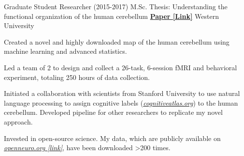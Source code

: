 \begin{cventries}
  \cventry
    {Graduate Student Researcher (2015-2017)} %
    {M.Sc. Thesis: Understanding the functional organization of the human cerebellum}
    {\href{http://ivrylab.berkeley.edu/uploads/4/1/1/5/41152143/functional_boundaries_in_the_human_cerebellum.pdf}{\textbf{Paper [Link]}}}
    {Western University} %
    {
      \begin{cvitems} %
        \item {Created a novel and highly downloaded map of the human cerebellum using machine learning and advanced statistics.}
      	\item {Led a team of 2 to design and collect a 26-task, 6-session fMRI and behavioral experiment, totaling 250 hours of data collection.}
      	\item {Initiated a collaboration with scientists from Stanford University to use natural language processing to assign cognitive labels ({\href{https://cognitiveatlas.org/}{\textit{cognitiveatlas.org}}}) to the human cerebellum. Developed pipeline for other researchers to replicate my novel approach.}
      	\item {Invested in open-source science. My data, which are publicly available on {\href{https://openneuro.org/datasets/ds002105/versions/1.1.0}{\textit{openneuro.org [link]}}}, have been downloaded >200 times.}
      \end{cvitems}
    }

\end{cventries}
